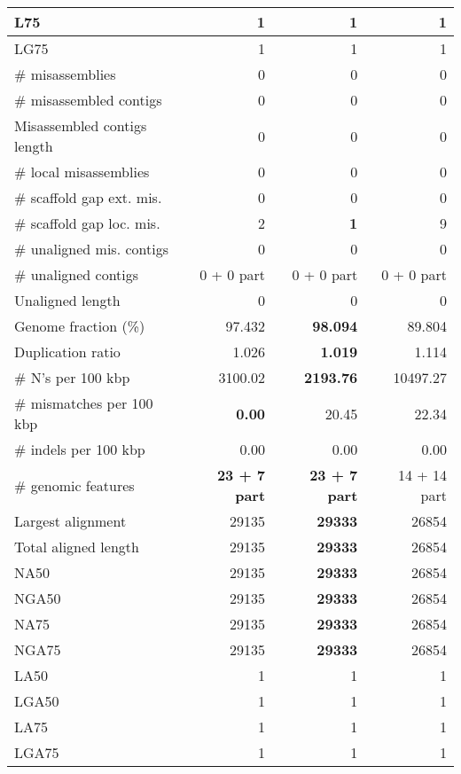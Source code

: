 \documentclass[12pt,a4paper]{article}
\begin{document}
\begin{table}[ht]
\begin{center}
\begin{tabular}{|l*{3}{|r}|}
L75 & 1 & 1 & 1 \\ \hline
LG75 & 1 & 1 & 1 \\ \hline
\# misassemblies & 0 & 0 & 0 \\ \hline
\# misassembled contigs & 0 & 0 & 0 \\ \hline
Misassembled contigs length & 0 & 0 & 0 \\ \hline
\# local misassemblies & 0 & 0 & 0 \\ \hline
\# scaffold gap ext. mis. & 0 & 0 & 0 \\ \hline
\# scaffold gap loc. mis. & 2 & {\bf 1} & 9 \\ \hline
\# unaligned mis. contigs & 0 & 0 & 0 \\ \hline
\# unaligned contigs & 0 + 0 part & 0 + 0 part & 0 + 0 part \\ \hline
Unaligned length & 0 & 0 & 0 \\ \hline
Genome fraction (\%) & 97.432 & {\bf 98.094} & 89.804 \\ \hline
Duplication ratio & 1.026 & {\bf 1.019} & 1.114 \\ \hline
\# N's per 100 kbp & 3100.02 & {\bf 2193.76} & 10497.27 \\ \hline
\# mismatches per 100 kbp & {\bf 0.00} & 20.45 & 22.34 \\ \hline
\# indels per 100 kbp & 0.00 & 0.00 & 0.00 \\ \hline
\# genomic features & {\bf 23 + 7 part} & {\bf 23 + 7 part} & 14 + 14 part \\ \hline
Largest alignment & 29135 & {\bf 29333} & 26854 \\ \hline
Total aligned length & 29135 & {\bf 29333} & 26854 \\ \hline
NA50 & 29135 & {\bf 29333} & 26854 \\ \hline
NGA50 & 29135 & {\bf 29333} & 26854 \\ \hline
NA75 & 29135 & {\bf 29333} & 26854 \\ \hline
NGA75 & 29135 & {\bf 29333} & 26854 \\ \hline
LA50 & 1 & 1 & 1 \\ \hline
LGA50 & 1 & 1 & 1 \\ \hline
LA75 & 1 & 1 & 1 \\ \hline
LGA75 & 1 & 1 & 1 \\ \hline
\end{tabular}
\end{center}
\end{table}
\end{document}

